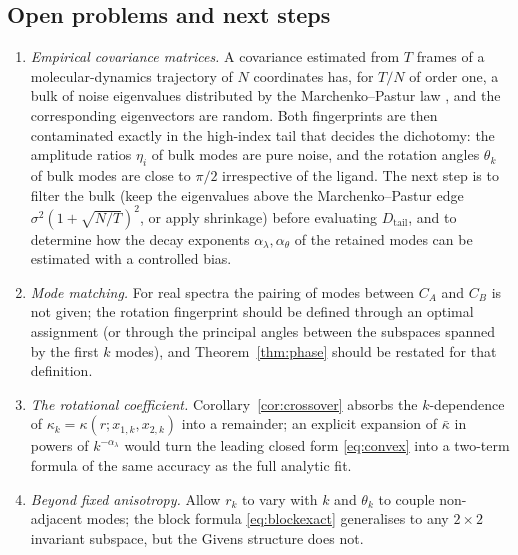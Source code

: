 \documentclass[11pt,reqno]{amsart}
\theoremstyle{plain}
\theoremstyle{definition}
\theoremstyle{remark}
\numberwithin{equation}{section}
\newcommand{\Dtail}{D_{\mathrm{tail}}}
\newcommand{\CA}{C_A}
\newcommand{\CB}{C_B}
\begin{document}
\subsection*{Open problems and next steps}
\begin{enumerate}[label=(\arabic*),leftmargin=*]
\item \emph{Empirical covariance matrices.} A covariance estimated from $T$ frames of a molecular-dynamics trajectory of $N$ coordinates has, for $T/N$ of order one, a bulk of noise eigenvalues distributed by the Marchenko--Pastur law \cite{MarchenkoPastur1967,Laloux1999}, and the corresponding eigenvectors are random. Both fingerprints are then contaminated exactly in the high-index tail that decides the dichotomy: the amplitude ratios $\eta_i$ of bulk modes are pure noise, and the rotation angles $\theta_k$ of bulk modes are close to $\pi/2$ irrespective of the ligand. The next step is to filter the bulk (keep the eigenvalues above the Marchenko--Pastur edge $\sigma^2(1+\sqrt{N/T})^2$, or apply shrinkage) before evaluating $\Dtail$, and to determine how the decay exponents $\alpha_\lambda,\alpha_\theta$ of the retained modes can be estimated with a controlled bias.
\item \emph{Mode matching.} For real spectra the pairing of modes between $\CA$ and $\CB$ is not given; the rotation fingerprint should be defined through an optimal assignment (or through the principal angles between the subspaces spanned by the first $k$ modes), and Theorem~\ref{thm:phase} should be restated for that definition.
\item \emph{The rotational coefficient.} Corollary~\ref{cor:crossover} absorbs the $k$-dependence of $\kappa_k=\kappa(r;x_{1,k},x_{2,k})$ into a remainder; an explicit expansion of $\bar\kappa$ in powers of $k^{-\alpha_\lambda}$ would turn the leading closed form \eqref{eq:convex} into a two-term formula of the same accuracy as the full analytic fit.
\item \emph{Beyond fixed anisotropy.} Allow $r_k$ to vary with $k$ and $\theta_k$ to couple non-adjacent modes; the block formula \eqref{eq:blockexact} generalises to any $2\times2$ invariant subspace, but the Givens structure does not.
\end{enumerate}
\end{document}
